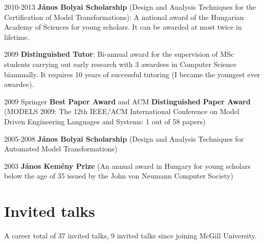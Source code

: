 \begin{yearlist}
\item[2010-2013] \textbf{J\'anos Bolyai Scholarship} (Design and Analysis Techniques for the Certification of Model Transformations): A national award of the Hungarian Academy of Sciences for young scholars. It can be awarded
at most twice in lifetime.
\item[2009] \textbf{Distinguished Tutor}: Bi-annual award for the supervision of MSc students carrying out early research with 3 awardees in Computer Science biannually. It requires 10 years of successful tutoring (I became the youngest ever awardee). 
\item[2009] Springer \textbf{Best Paper Award} and ACM \textbf{Distinguished Paper Award} (MODELS
2009: The 12th IEEE/ACM International Conference on Model Driven Engineering Languages and Systems: 1 out of 58 papers) 
\item[2005-2008] \textbf{J\'anos Bolyai Scholarship} (Design and Analysis Techniques for Automated Model Transformations) 
\item[2003] \textbf{J\'anos Kem\'eny Prize } (An annual award in Hungary for young scholars below the age of 35 issued by the John von Neumann Computer Society)
\end{yearlist}

\section{Invited talks}

A career total of 37 invited talks, 9 invited talks since joining McGill University. 

